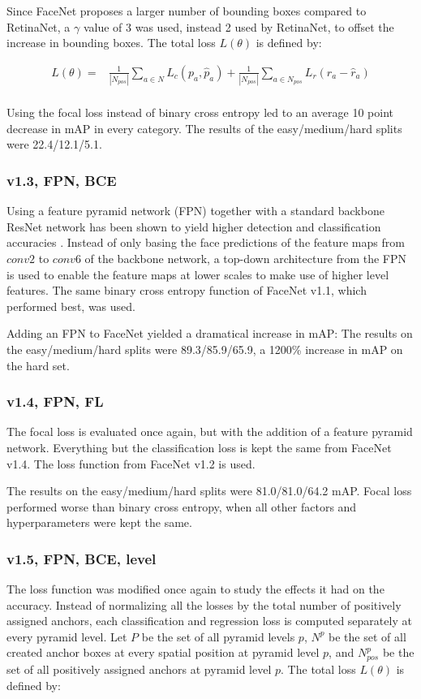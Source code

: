 \documentclass[a4paper, twoside]{article}
\begin{document}
Since FaceNet proposes a larger number of bounding boxes compared to RetinaNet, a $\gamma$ value of 3 was used, instead 2 used by RetinaNet, to offset the increase in bounding boxes. The total loss $L(\theta)$ is defined by:

\begin{equation}
\begin{split}
	L(\theta) = &  \frac{1}{|N_{pos}|} \sum_{a \in N} L_c(p_a, \hat{p}_a) 
	 + \frac{1}{|N_{pos}|} \sum_{a \in N_{pos}} L_r(r_a - \hat{r}_a)  \\ 
\end{split}
\end{equation}

Using the focal loss instead of binary cross entropy led to an average 10 point decrease in mAP in every category. The results of the easy/medium/hard splits were 22.4/12.1/5.1.

\subsubsection{v1.3, FPN, BCE}
Using a feature pyramid network (FPN) together with a standard backbone ResNet network has been shown to yield higher detection and classification accuracies \cite{fpn}. Instead of only basing the face predictions of the feature maps from $conv2$ to $conv6$ of the backbone network, a top-down architecture from the FPN is used to enable the feature maps at lower scales to make use of higher level features. The same binary cross entropy function of FaceNet v1.1, which performed best, was used.

Adding an FPN to FaceNet yielded a dramatical increase in mAP: The results on the easy/medium/hard splits were 89.3/85.9/65.9, a 1200\% increase in mAP on the hard set.

\subsubsection{v1.4, FPN, FL}
The focal loss is evaluated once again, but with the addition of a feature pyramid network. Everything but the classification loss is kept the same from FaceNet v1.4. The loss function from FaceNet v1.2 is used.

The results on the easy/medium/hard splits were 81.0/81.0/64.2 mAP. Focal loss performed worse than binary cross entropy, when all other factors and hyperparameters were kept the same.

\subsubsection{v1.5, FPN, BCE, level}
The loss function was modified once again to study the effects it had on the accuracy. Instead of normalizing all the losses by the total number of positively assigned anchors, each classification and regression loss is computed separately at every pyramid level. Let $P$ be the set of all pyramid levels $p$, $N^p$ be the set of all created anchor boxes at every spatial position at pyramid level $p$, and $N^p_{pos}$ be the set of all positively assigned anchors at pyramid level $p$. The total loss $L(\theta)$ is defined by:
\end{document}
